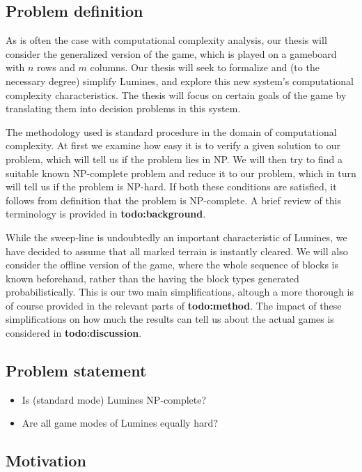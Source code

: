 \subsection{Problem definition}
As is often the case with computational complexity analysis, our thesis will consider the generalized version of the game, which is played on a gameboard with $n$ rows and $m$ columns. Our thesis will seek to formalize and (to the necessary degree) simplify Lumines, and explore this new system's computational complexity characteristics. The thesis will focus on certain goals of the game by translating them into decision problems in this system.

The methodology used is standard procedure in the domain of computational complexity. At first we examine how easy it is to verify a given solution to our problem, which will tell us if the problem lies in NP. We will then try to find a suitable known NP-complete problem and reduce it to our problem, which in turn will tell us if the problem is NP-hard. If both these conditions are satisfied, it follows from definition that the problem is NP-complete. A brief review of this terminology is provided in \textbf{todo:background}.

While the sweep-line is undoubtedly an important characteristic of Lumines, we have decided to assume that all marked terrain is instantly cleared. We will also consider the offline version of the game, where the whole sequence of blocks is known beforehand, rather than the having the block types generated probabilistically. This is our two main simplifications, altough a more thorough is of course provided in the relevant parts of \textbf{todo:method}. The impact of these simplifications on how much the results can tell us about the actual games is considered in \textbf{todo:discussion}.

\subsection{Problem statement}
\begin{itemize}
        \item Is (standard mode) Lumines NP-complete?
        \item Are all game modes of Lumines equally hard?
\end{itemize}

\subsection{Motivation}

